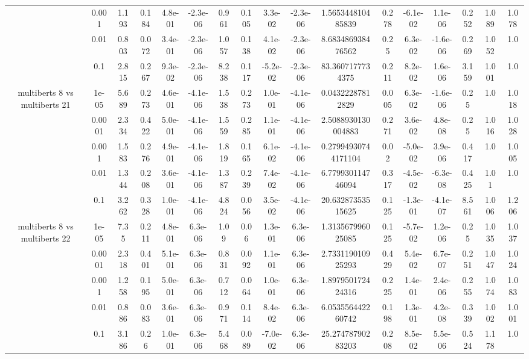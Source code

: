 \begin{tabular}{|c|c|c|c|c|c|c|c|c|c|c|c|c|c|c|c|c|}
 & 0.001 & 1.193 & 0.184 & 4.8e-01 & -2.3e-06 & 0.961 & 0.105 & 3.3e-02 & -2.3e-06 & 1.565344810485839 & 0.278 & -6.1e-02 & 1.1e-06 & 0.252 & 1.089 & 1.078 \\
 & 0.01 & 0.803 & 0.072 & 3.4e-01 & -2.3e-06 & 1.057 & 0.138 & 4.1e-02 & -2.3e-06 & 8.683486938476562 & 0.25 & 6.3e-02 & -1.6e-06 & 0.269 & 1.052 & 1.0 \\
 & 0.1 & 2.815 & 0.267 & 9.3e-02 & -2.3e-06 & 8.238 & 0.117 & -5.2e-02 & -2.3e-06 & 83.3607177734375 & 0.211 & 8.2e-02 & 1.6e-06 & 3.159 & 1.001 & 1.0 \\
\hline
\multirow{5}{*}{multiberts 8 vs multiberts 21} & 1e-05 & 5.689 & 0.273 & 4.6e-01 & -4.1e-06 & 1.538 & 0.273 & 1.0e-01 & -4.1e-06 & 0.04322287812829 & 0.005 & 6.3e-02 & -1.6e-06 & 0.25 & 1.0 & 1.018 \\
 & 0.0001 & 2.334 & 0.422 & 5.0e-01 & -4.1e-06 & 1.559 & 0.285 & 1.1e-01 & -4.1e-06 & 2.5088930130004883 & 0.271 & 3.6e-02 & 4.8e-08 & 0.25 & 1.016 & 1.028 \\
 & 0.001 & 1.583 & 0.276 & 4.9e-01 & -4.1e-06 & 1.819 & 0.165 & 6.1e-02 & -4.1e-06 & 0.27994930744171104 & 0.02 & -5.0e-02 & 3.9e-06 & 0.417 & 1.0 & 1.005 \\
 & 0.01 & 1.344 & 0.208 & 3.6e-01 & -4.1e-06 & 1.387 & 0.239 & 7.4e-02 & -4.1e-06 & 6.779930114746094 & 0.317 & -4.5e-02 & -6.3e-08 & 0.425 & 1.01 & 1.0 \\
 & 0.1 & 3.262 & 0.328 & 1.0e-01 & -4.1e-06 & 4.824 & 0.056 & 3.5e-02 & -4.1e-06 & 20.63287353515625 & 0.125 & -1.3e-01 & -4.1e-07 & 8.561 & 1.006 & 1.206 \\
\hline
\multirow{5}{*}{multiberts 8 vs multiberts 22} & 1e-05 & 7.35 & 0.211 & 4.8e-01 & 6.3e-06 & 1.09 & 0.06 & 1.3e-01 & 6.3e-06 & 1.313567996025085 & 0.125 & -5.7e-02 & 1.2e-06 & 0.25 & 1.035 & 1.037 \\
 & 0.0001 & 2.318 & 0.401 & 5.1e-01 & 6.3e-06 & 0.831 & 0.092 & 1.1e-01 & 6.3e-06 & 2.733119010925293 & 0.429 & 5.4e-02 & 6.7e-07 & 0.251 & 1.047 & 1.024 \\
 & 0.001 & 1.258 & 0.195 & 5.0e-01 & 6.3e-06 & 0.712 & 0.064 & 1.0e-01 & 6.3e-06 & 1.897950172424316 & 0.225 & 1.4e-01 & 2.4e-06 & 0.255 & 1.074 & 1.083 \\
 & 0.01 & 0.886 & 0.083 & 3.6e-01 & 6.3e-06 & 0.971 & 0.114 & 8.4e-02 & 6.3e-06 & 6.053556442260742 & 0.198 & 1.3e-01 & 4.2e-08 & 0.339 & 1.002 & 1.001 \\
 & 0.1 & 3.186 & 0.26 & 1.0e-01 & 6.3e-06 & 5.468 & 0.089 & -7.0e-02 & 6.3e-06 & 25.27478790283203 & 0.208 & 8.5e-02 & 5.5e-06 & 0.524 & 1.178 & 1.0 \\

\end{tabular}
